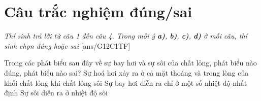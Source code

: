 

\section{Câu trắc nghiệm đúng/sai} 
\textit{Thí sinh trả lời từ câu 1 đến câu 4. Trong mỗi ý \textbf{a)}, \textbf{b)}, \textbf{c)}, \textbf{d)} ở mỗi câu, thí sinh chọn đúng hoặc sai}
\setcounter{ex}{0}
[ans/G12C1TF]
\begin{ex}
	Trong các phát biểu sau đây về sự bay hơi và sự sôi của chất lỏng, phát biểu nào đúng, phát biểu nào sai?
	{\True Sự hoá hơi xảy ra ở cả mặt thoáng và trong lòng của khối chất lỏng khi chất lỏng sôi}
	{Sự bay hơi diễn ra chỉ ở một số nhiệt độ nhất định}
	{\True Sự sôi diễn ra ở nhiệt độ sôi}
\end{ex}
